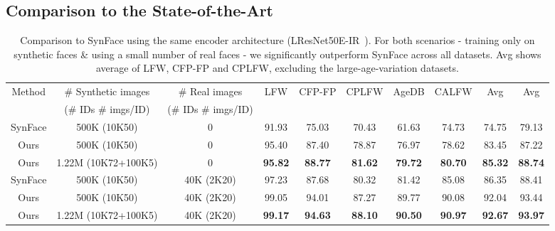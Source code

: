 \documentclass[10pt,twocolumn,letterpaper]{article}
\begin{document}
\subsection{Comparison to the State-of-the-Art}
\label{sec:exp4}

\begin{table*}[]
\footnotesize
\setlength{\tabcolsep}{2.9pt}
\begin{center}
\begin{tabular}{c|c|c|ccccc|cc}
\toprule
\multirow{2}{*}{Method} & \# Synthetic images & \# Real images
& \multirow{2}{*}{LFW} & \multirow{2}{*}{CFP-FP} & \multirow{2}{*}{CPLFW} & \multirow{2}{*}{AgeDB} & \multirow{2}{*}{CALFW} & \multirow{2}{*}{Avg} & \multirow{2}{*}{Avg}\\
& {\footnotesize (\# IDs  \# imgs/ID)} & {\footnotesize (\# IDs  \# imgs/ID)}
& & & & & & \\
\midrule
SynFace \cite{2021_FR_synface} & 500K {\small (10K50)} & 0 &
91.93 & 75.03 & 70.43 & 61.63 & 74.73 & 74.75 & 79.13\\
Ours & 500K {\small (10K50)} & 0 
& 95.40 & 87.40 & 78.87 & 76.97 & 78.62 & 83.45 & 87.22\\
Ours & 1.22M {\small (10K72+100K5)} & 0 
& \textbf{95.82} & \textbf{88.77} & \textbf{81.62} & \textbf{79.72} & \textbf{80.70} & \textbf{85.32} & \textbf{88.74}\\
\midrule
SynFace \cite{2021_FR_synface} & 500K {\small (10K50)}  & 40K {\small (2K20)} &
97.23 & 87.68 & 80.32 & 81.42 & 85.08 & 86.35 & 88.41 \\
Ours & 500K {\small (10K50)}  & 40K {\small (2K20)} & 
99.05 & 94.01 & 87.27 & 89.77 & 90.08 & 92.04 & 93.44 \\
Ours & 1.22M {\small (10K72+100K5)} & 40K {\small (2K20)} &
\textbf{99.17} & \textbf{94.63} & \textbf{88.10} & \textbf{90.50} & \textbf{90.97} & \textbf{92.67} & \textbf{93.97}\\
\bottomrule
\end{tabular}
\end{center}
\caption{Comparison to SynFace using the same encoder architecture (LResNet50E-IR~\cite{2021_FR_synface}). For both scenarios - training only on synthetic faces \& using a small number of real faces - we significantly outperform SynFace across all datasets. Avg shows average of LFW, CFP-FP and CPLFW, excluding the large-age-variation datasets.}
\label{table:synface_comparison}
\end{table*}
\end{document}
